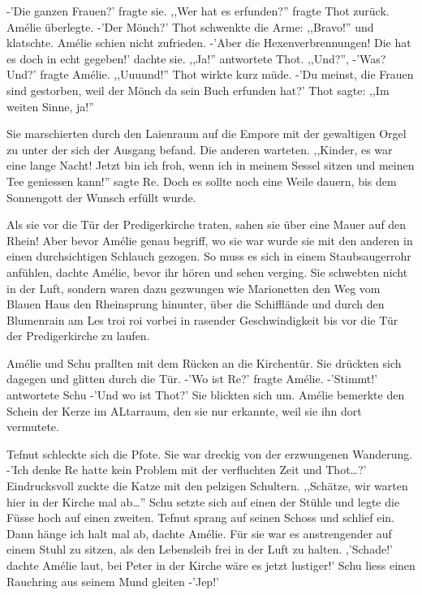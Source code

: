 \documentclass[11pt,titlepage,a5paper]{book}
\begin{document}
-'Die ganzen Frauen?' fragte sie. ,,Wer hat es erfunden?'' fragte Thot zurück. Amélie überlegte. -'Der Mönch?' Thot schwenkte die Arme: ,,Bravo!'' und klatschte. Amélie schien nicht zufrieden. -'Aber die Hexenverbrennungen! Die hat es doch in echt gegeben!' dachte sie. ,,Ja!'' antwortete Thot. ,,Und?'', -'Was? Und?' fragte Amélie. ,,Uuuund!'' Thot wirkte kurz müde. -'Du meinst, die Frauen sind gestorben, weil der Mönch da sein Buch erfunden hat?' Thot sagte: ,,Im weiten Sinne, ja!''

Sie marschierten durch den Laienraum auf die Empore mit der gewaltigen Orgel zu unter der sich der Ausgang befand. Die anderen warteten. ,,Kinder, es war eine lange Nacht! Jetzt bin ich froh, wenn ich in meinem Sessel sitzen und meinen Tee geniessen kann!'' sagte Re. Doch es sollte noch eine Weile dauern, bis dem Sonnengott der Wunsch erfüllt wurde. 

Als sie vor die Tür der Predigerkirche traten, sahen sie über eine Mauer auf den Rhein! Aber bevor Amélie genau begriff, wo sie war wurde sie mit den anderen in einen durchsichtigen Schlauch gezogen. So muss es sich in einem Staubsaugerrohr anfühlen, dachte Amélie, bevor ihr hören und sehen verging. Sie schwebten nicht in der Luft, sondern waren dazu gezwungen wie Marionetten den Weg vom Blauen Haus den Rheinsprung hinunter, über die Schifflände und durch den Blumenrain am Les troi roi vorbei in rasender Geschwindigkeit bis vor die Tür der Predigerkirche zu laufen. 

Amélie und Schu prallten mit dem Rücken an die Kirchentür. Sie drückten sich dagegen und glitten durch die Tür. -'Wo ist Re?' fragte Amélie. -'Stimmt!' antwortete Schu -'Und wo ist Thot?' Sie blickten sich um. Amélie bemerkte den Schein der Kerze im ALtarraum, den sie nur erkannte, weil sie ihn dort vermutete.

Tefnut schleckte sich die Pfote. Sie war dreckig von der erzwungenen Wanderung. -'Ich denke Re hatte kein Problem mit der verfluchten Zeit und Thot\dots ?' Eindrucksvoll zuckte die Katze mit den pelzigen Schultern. ,,Schätze, wir warten hier in der Kirche mal ab\dots '' Schu setzte sich auf einen der Stühle und legte die Füsse hoch auf einen zweiten. Tefnut sprang auf seinen Schoss und schlief ein. Dann hänge ich halt mal ab, dachte Amélie. Für sie war es anstrengender auf einem Stuhl zu sitzen, als den Lebensleib frei in der Luft zu halten. ,'Schade!' dachte Amélie laut, bei Peter in der Kirche wäre es jetzt lustiger!' Schu liess einen Rauchring aus seinem Mund gleiten -'Jep!'  
\end{document}
